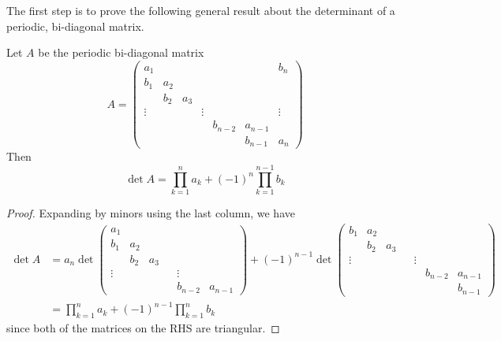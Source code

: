 \documentclass[thesis.tex]{subfiles}
\begin{document}
The first step is to prove the following general result about the determinant of a periodic, bi-diagonal matrix.

\begin{lemma}\label{bidiag}
Let $A$ be the periodic bi-diagonal matrix
\begin{equation}
A = \begin{pmatrix}
a_1 & & & & & & b_n \\
b_1 & a_2 \\
& b_2 & a_3 \\
\vdots & & & \vdots & &&  \vdots \\
& & & & b_{n-2} & a_{n-1} \\
& & & & & b_{n-1} & a_n
\end{pmatrix}
\end{equation}
Then 
\begin{equation}
\det{A} = \prod_{k = 1}^n a_k + (-1)^n \prod_{k = 1}^{n-1} b_k
\end{equation}
\begin{proof}
Expanding by minors using the last column, we have
\begin{align*}
\det A &= a_n \det
\begin{pmatrix}
a_1 \\
b_1 & a_2 \\
& b_2 & a_3 \\
\vdots & & & & \vdots \\
& & & & b_{n-2} & a_{n-1}
\end{pmatrix}
+ (-1)^{n-1} \det
\begin{pmatrix}
b_1 & a_2 \\
& b_2 & a_3 \\
\vdots & & & & \vdots \\
& & & & & b_{n-2} & a_{n-1} \\
& & & & & & b_{n-1}
\end{pmatrix} \\
&= \prod_{k = 1}^n a_k + (-1)^{n-1} \prod_{k = 1}^n b_k
\end{align*}
since both of the matrices on the RHS are triangular.
\end{proof}
\end{lemma}
\end{document}
